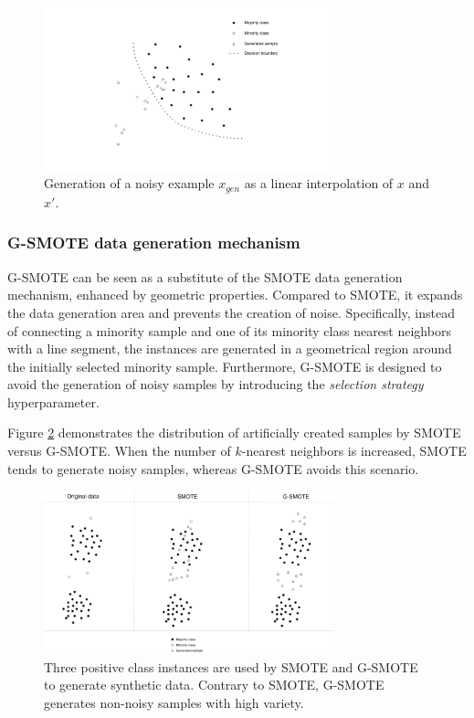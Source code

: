 \begin{figure}
	\centering
	\includegraphics[width=0.75\textwidth]{../analysis/noisy_examples.png}
	\caption{Generation of a noisy example $x_{gen}$ as a linear interpolation of $x$ and $x'$.}
	\label{fig:noisy-examples}
\end{figure}

\subsubsection{G-SMOTE data generation mechanism}

G-SMOTE can be seen as a substitute of the SMOTE data generation mechanism, enhanced by geometric properties. Compared to SMOTE, it expands the data generation area and prevents the creation of noise. Specifically, instead of connecting a minority sample and one of its minority class nearest neighbors with a line segment, the instances are generated in a geometrical region around the initially selected minority sample. Furthermore, G-SMOTE is designed to avoid the generation of noisy samples by introducing the \textit{selection strategy} hyperparameter.   

Figure \ref{fig:smotevsgsmote} demonstrates the distribution of artificially created samples by SMOTE versus G-SMOTE. When the number of \( k \)-nearest neighbors is increased, SMOTE tends to generate noisy samples, whereas G-SMOTE avoids this scenario.

\begin{figure}
	\centering
	\includegraphics[width=0.75\textwidth]{../analysis/smote_vs_gsmote}
	\caption{Three positive class instances are used by SMOTE and G-SMOTE 
	to generate synthetic data. Contrary to SMOTE, G-SMOTE generates non-noisy samples with high variety.}
	\label{fig:smotevsgsmote}
\end{figure}

